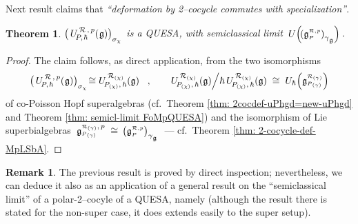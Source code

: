 \documentclass[12pt,reqno,twoside,a4paper]{amsart}
\numberwithin{equation}{section}
\newtheorem{theorem}[lema]{Theorem}
\theoremstyle{definition}
\newtheorem{rmk}[lema]{Remark}
\newtheorem{free text}[lema]{}
\theoremstyle{remark}
\newcommand{\R}{{\mathcal R}}
\def \Ppicc {{\scriptscriptstyle P}}
\def \Rpicc {{\scriptscriptstyle \R}}
\def \lieg{\mathfrak{g}}
\def \liegRpP{\mathfrak{g}^{\raise1pt\hbox{$ \scriptscriptstyle \mathcal{R},p $}}_\Ppicc}
\def \uRpPhg{U^{\,\R\,,\,p}_{\!P,\hskip0,7pt\hbar}(\hskip0,5pt\lieg)}
\def \pf{\begin{proof}}
\def \epf{\end{proof}}
\theoremstyle{plain}
\begin{document}
\vskip5pt

 Next result claims that  \textsl{``deformation by 2--cocycle commutes with specialization''}.

\vskip13pt

\begin{theorem}  \label{thm: specializ 2-cocycle FoMpQUESA}
%
 $ {\big(\, \uRpPhg \big)}_{\sigma_\chi} $  is a QUESA, with semiclassical limit  $ \, U\Big(\! {(\liegRpP)}_{\gamma\raisebox{-1pt}{$ {}_\lieg $}} \Big) \, $.
%
%
\end{theorem}

\pf
%
 The claim follows, as direct application, from the two isomorphisms
%
  $$  {\big(\, \uRpPhg \big)}_{\sigma_\chi}
%
%
 \!\cong
%
 U_{\!P_{(\chi)},\,\hbar}^{\,\R_{(\chi)}}(\lieg)  \;\;\; ,  \qquad
       U_{\!P_{(\chi)},\,\hbar}^{\,\R_{(\chi)}}(\lieg) \Big/ \hbar \,
   U_{\!P_{(\chi)},\,\hbar}^{\,\R_{(\chi)}}(\lieg)
%
%
 \;\cong\;
%
 U_\hbar\Big( \lieg_{\Ppicc_{(\gamma)}}^{\Rpicc_{(\gamma)}} \Big)   $$
%
 of co-Poisson Hopf superalgebras  (cf.\ Theorem \ref{thm: 2cocdef-uPhgd=new-uPhgd}  and  Theorem \ref{thm: semicl-limit FoMpQUESA})  and the isomorphism of Lie superbialgebras
%
   $ \; \lieg^{\Rpicc_{(\gamma)},\,p}_{\Ppicc_{(\gamma)}}
%
%
 \;\cong\,
%
 {\big(\liegRpP\big)}_{\gamma\raisebox{-1pt}{$ {}_\lieg $}} \; $
%
   --- cf.\ Theorem \ref{thm: 2-cocycle-def-MpLSbA}.
%
\epf

\vskip5pt

\begin{rmk}
%
 The previous result is proved by direct inspection; nevertheless, we can deduce it also as an application of a general result on the ``semiclassical limit'' of a polar-2--cocyle of a QUESA, namely  \cite[Theorem 3.3.72]{GG4}  (although the result there is stated for the non-super case, it does extends easily to the super setup).

%
\end{rmk}

\medskip
\end{document}
